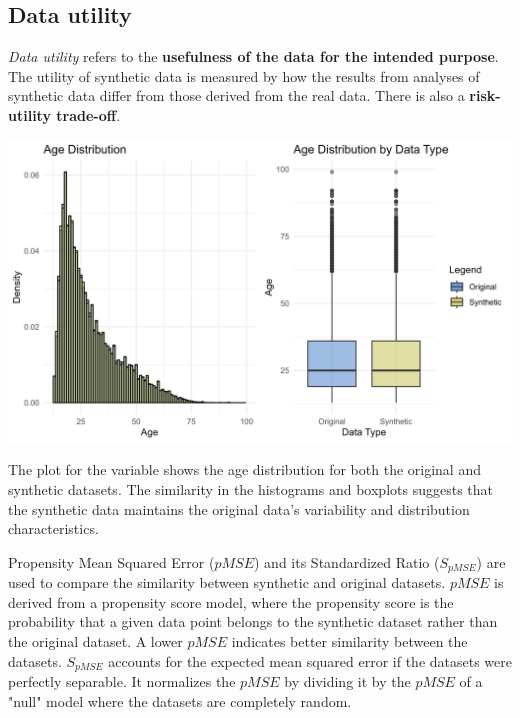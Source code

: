 \documentclass[a0,portrait]{a0poster}
\begin{document}
\begin{multicols}{3}

\columnbreak %

\subsection{Data utility}

\textit{Data utility} refers to the \textbf{usefulness of the data for the intended purpose}. 
The utility of synthetic data is measured by how the results from analyses of synthetic data differ from those derived from the real data.
There is also a \textbf{risk-utility trade-off}.

\includegraphics[width=1\linewidth]{Poster TEX/figures/Hist_box_age_v5.png}

\vspace{1cm}

The plot for the variable shows the age distribution for both the original and synthetic datasets.
The similarity in the histograms and boxplots suggests that the synthetic data maintains the original data's variability and distribution characteristics.

\vspace{1cm}

Propensity Mean Squared Error ($pMSE$) and its Standardized Ratio ($S_{pMSE}$) are used to compare the similarity between synthetic and original datasets. $pMSE$ is derived from a propensity score model, where the propensity score is the probability that a given data point belongs to the synthetic dataset rather than the original dataset. A lower $pMSE$ indicates better similarity between the datasets.
$S_{pMSE}$ accounts for the expected mean squared error if the datasets were perfectly separable. It normalizes the $pMSE$ by dividing it by the $pMSE$ of a "null" model where the datasets are completely random.


\end{multicols}
\end{document}
